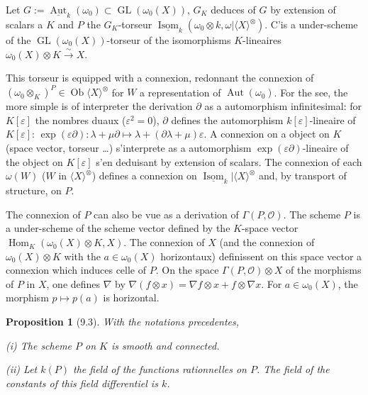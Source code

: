 \documentclass[12pt,a4paper]{article}
\theoremstyle{plain}
\newtheorem{proposition}[theorem]{Proposition}
\theoremstyle{definition}
\DeclareMathOperator{\Hom}{Hom}
\DeclareMathOperator{\Aut}{Aut}
\DeclareMathOperator{\Isom}{Isom}
\DeclareMathOperator{\GL}{GL}
\DeclareMathOperator{\Ob}{Ob}
\begin{document}
Let $G := \underline{\Aut}_k(\omega_0) \subset \GL(\omega_0(X))$, $G_K$ deduces of $G$ by extension of scalars a $K$ and $P$ the $G_K$-torseur $\underline{\Isom}_k(\omega_0 \otimes k, \omega | \langle X \rangle^\otimes)$. C'is a under-scheme of the $\GL(\omega_0(X))$-torseur of the isomorphisms $K$-lineaires $\omega_0(X) \otimes K \xrightarrow{\sim} X$.

This torseur is equipped with a connexion, redonnant the connexion of $(\omega_0 \otimes_K)^P \in \Ob \langle X \rangle^\otimes$ for $W$ a representation of $\Aut(\omega_0)$. For the see, the more simple is of interpreter the derivation $\partial$ as a automorphism infinitesimal: for $K[\varepsilon]$ the nombres duaux ($\varepsilon^2 = 0$), $\partial$ defines the automorphism $k[\varepsilon]$-lineaire of $K[\varepsilon]$: $\exp(\varepsilon\partial) : \lambda + \mu \partial \mapsto \lambda + (\partial\lambda + \mu)\varepsilon$. A connexion on a object on $K$ (space vector, torseur \ldots) s'interprete as a automorphism $\exp(\varepsilon\partial)$-lineaire of the object on $K[\varepsilon]$ s'en deduisant by extension of scalars. The connexion of each $\omega(W)$ ($W$ in $\langle X \rangle^\otimes$) defines a connexion on $\underline{\Isom}_k | \langle X \rangle^\otimes$ and, by transport of structure, on $P$.

The connexion of $P$ can also be vue as a derivation of $\Gamma(P, \mathcal{O})$. The scheme $P$ is a under-scheme of the scheme vector defined by the $K$-space vector $\Hom_K(\omega_0(X) \otimes K, X)$. The connexion of $X$ (and the connexion of $\omega_0(X) \otimes K$ with the $a \in \omega_0(X)$ horizontaux) definissent on this space vector a connexion which induces celle of $P$. On the space $\Gamma(P, \mathcal{O}) \otimes X$ of the morphisms of $P$ in $X$, one defines $\nabla$ by $\nabla(f \otimes x) = \nabla f \otimes x + f \otimes \nabla x$. For $a \in \omega_0(X)$, the morphism $p \mapsto p(a)$ is horizontal.

\begin{proposition}[9.3]
With the notations precedentes,

\textup{(i)} The scheme $P$ on $K$ is smooth and connected.

\textup{(ii)} Let $k(P)$ the field of the functions rationnelles on $P$. The field of the constants of this field differentiel is $k$.
\end{proposition}
\end{document}
